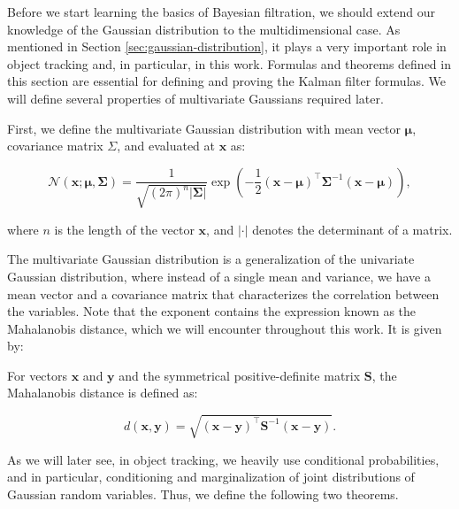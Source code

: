 Before we start learning the basics of Bayesian filtration, we should extend our knowledge of the Gaussian distribution to the multidimensional case. As mentioned in Section \ref{sec:gaussian-distribution}, it plays a very important role in object tracking and, in particular, in this work. Formulas and theorems defined in this section are essential for defining and proving the Kalman filter formulas. We will define several properties of multivariate Gaussians required later.

First, we define the multivariate Gaussian distribution with mean vector $\boldsymbol\mu$, covariance matrix $\Sigma$, and evaluated at $\mathbf{x}$ as:

\begin{equation}\label{eq:vec-gauss-def}
    \mathscr{N}\left(\mathbf{x} ; \mathbf\mu, \mathbf\Sigma\right)
    = \frac{1}{\sqrt{(2\pi)^n|\mathbf{\Sigma}|}}\exp\left(-\frac{1}{2}(\mathbf{x}-\boldsymbol{\mu})^\top \mathbf{\Sigma}^{-1} (\mathbf{x}-\boldsymbol{\mu})\right),
\end{equation}

\noindent where $n$ is the length of the vector $\mathbf{x}$, and $|\cdot|$ denotes the determinant of a matrix. 

The multivariate Gaussian distribution is a generalization of the univariate Gaussian distribution, where instead of a single mean and variance, we have a mean vector and a covariance matrix that characterizes the correlation between the variables. Note that the exponent contains the expression known as the Mahalanobis distance, which we will encounter throughout this work. It is given by:

\begin{definition}\label{def:mahalanobis}
    For vectors $\mathbf x$ and $\mathbf y$ and the symmetrical positive-definite matrix $\mathbf S$, the Mahalanobis distance is defined as:

    \begin{equation}
        d(\mathbf x, \mathbf y) 
        = \sqrt{
            (\mathbf x - \mathbf y)^\intercal
            \mathbf{S}^{-1}
            (\mathbf x - \mathbf y)
        }.
    \end{equation}
\end{definition}

As we will later see, in object tracking, we heavily use conditional probabilities, and in particular, conditioning and marginalization of joint distributions of Gaussian random variables. Thus, we define the following two theorems.

